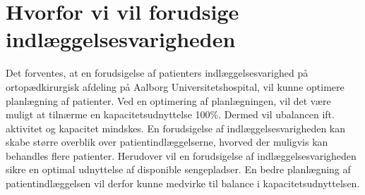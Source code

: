 \section{Hvorfor vi vil forudsige indlæggelsesvarigheden}

Det forventes, at en forudsigelse af patienters indlæggelsesvarighed på ortopædkirurgisk afdeling på Aalborg Universitetshospital, vil kunne optimere planlægning af patienter. Ved en optimering af planlægningen, vil det være muligt at tilnærme en kapacitetsudnyttelse 100\%. Dermed vil ubalancen ift. aktivitet og kapacitet mindskes. En forudsigelse af indlæggelsesvarigheden kan skabe større overblik over patientindlæggelserne, hvorved der muligvis kan behandles flere patienter. Herudover vil en forudsigelse af indlæggelsesvarigheden sikre en optimal udnyttelse af disponible sengepladser. En bedre planlægning af patientindlæggelsen vil derfor kunne medvirke til balance i kapacitetsudnyttelsen. 
